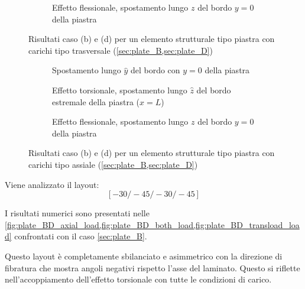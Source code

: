 \documentclass[a4paper,num-refs]{oup-contemporary}
\begin{document}
\begin{figure}[bt!]
\begin{subfigure}[t]{0.3\textwidth}
	\end{subfigure}
	\hfill
	\begin{subfigure}[t]{0.3\textwidth}
		\centering
		\caption{Effetto flessionale, spostamento lungo $z$ del bordo $y=0$ della piastra}
		
	\end{subfigure}
	\hfill
	\caption{Risultati caso (b) e (d) per un elemento strutturale tipo piastra con carichi tipo trasversale (\cref{sec:plate_B,sec:plate_D})}
	\label{fig:plate_BD_transload_load}

	\centering
	
	\begin{subfigure}[t]{0.3\textwidth}
		\centering
		\caption{Spostamento lungo $\hat y$ del bordo con $y=0$ della piastra}
		
	\end{subfigure}
	\hfill
	\begin{subfigure}[t]{0.3\textwidth}
		\centering
		
		\caption{Effetto torsionale, spostamento lungo $\hat z$ del bordo estremale della piastra ($x=L$)}
		
	\end{subfigure}
	\hfill
	\begin{subfigure}[t]{0.3\textwidth}
		\centering
		\caption{Effetto flessionale, spostamento lungo $z$ del bordo $y=0$ della piastra}
		\label{fig:plate_BD_extra}
	\end{subfigure}
	\hfill
	\caption{Risultati caso (b) e (d) per un elemento strutturale tipo piastra con carichi tipo assiale (\cref{sec:plate_B,sec:plate_D})}
	\label{fig:plate_BD_axial_load}
\end{figure}

Viene analizzato il layout:
\begin{equation}
\left[-30 /-45 /-30 /-45\right]
\end{equation}

I risultati numerici sono presentati nelle \cref{fig:plate_BD_axial_load,fig:plate_BD_both_load,fig:plate_BD_transload_load} confrontati con il caso \cref{sec:plate_B}.  

Questo layout è completamente sbilanciato e asimmetrico con la direzione di fibratura che mostra angoli negativi rispetto l'asse del laminato. Questo si riflette nell'accoppiamento dell'effetto torsionale con tutte le condizioni di carico. 
\end{document}
